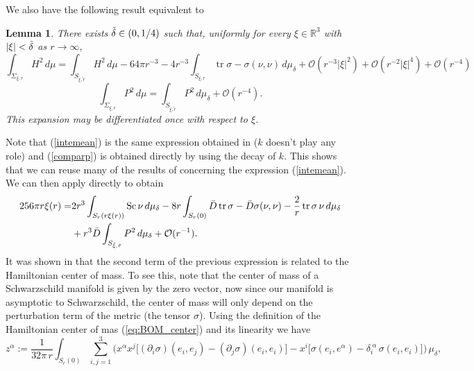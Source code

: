 \documentclass[12pt,a4paper]{amsart}
\theoremstyle{plain}
\newtheorem{lemma}[theorem]{Lemma}
\theoremstyle{definition}
\begin{document}
We also have the following result equivalent to \cite[Lemma 14]{willcen}
\begin{lemma}
    There exists \(\Tilde{\delta} \in (0, 1/4)\) such that, uniformly for every \(\xi \in \mathbb{R}^3\) with \(|\xi| < \Tilde{\delta}\) as \(r \to \infty\),
\begin{equation}\label{intemean}
\int_{\Sigma_{\xi,r}} H^2 \, d\mu = \int_{S_{\tilde{\xi},\tilde{r}}} H^2 \, d\mu - 64 \pi r^{-3} - 4 r^{-3} \int_{S_{\xi,r}} \operatorname{tr} \sigma - \sigma(\nu, \nu)\,  d\mu_{\delta} + \mathcal{O}(r^{-3} |\xi|^2) + \mathcal{O}(r^{-2} |\xi|^4) + \mathcal{O}(r^{-4})
\end{equation}
\begin{equation}\label{comparp}
    \int_{\Sigma_{\xi,r}} P^2 \, d\mu = \int_{S_{\tilde{\xi},\tilde{r}}} P^2 \, d\mu_{\delta} + \mathcal{O}(r^{-4}).
\end{equation}
This expansion may be differentiated once with respect to \(\xi\).
\end{lemma}
Note that (\ref{intemean}) is the same expression obtained in \cite[Lemma 14]{willcen} ($k$ doesn't play any role) and (\ref{comparp}) is obtained directly by using the decay of $k$. This shows that we can reuse many of the results of \cite{willcen} concerning the expression (\ref{intemean}).  We can then apply directly \cite[Proposition 18]{willcen} to obtain 
\begin{equation}\label{precenter}
    \begin{split}
       256 \pi r \xi(r) =& 2r^3 \int_{S_r(r \xi(r))} \mathrm{Sc} \, \nu\, d\mu_{\delta}-8 r \int_{S_r(0)}  \Bar{D} \operatorname{tr} \sigma -  \Bar{D}\sigma(\nu, \nu) -\frac{2}{r} \operatorname{tr} \sigma\, \nu \,d\mu_{\delta} \\
       &+ r^3\Bar{D} \int_{S_{\tilde{\xi},\tilde{r}}} P^2 \, d\mu_{\delta} + \mathcal{O}(r^{-1}). 
    \end{split}
\end{equation}
It was shown in \cite[Proposition 18]{willcen} that the second term of the previous expression is related to the Hamiltonian center of mass. To see this, note that the center of mass of a Schwarzschild manifold is given by the zero vector, now since our manifold is asymptotic to Schwarzschild, the center of mass will only depend on the perturbation term of the metric (the tensor $\sigma$).  Using the definition of the Hamiltonian center of mas  (\ref{eq:BOM_center}) and its linearity we have 
\[
z^\alpha := \frac{1}{32\pi\,r}
\int_{S_r(0)} 
\sum_{i,j=1}^3
\Big(
x^\alpha x^j \big[ (\partial_i \sigma)(e_i, e_j) - (\partial_j \sigma)(e_i, e_i) \big]
-
x^i \big[ \sigma(e_i, e^\alpha) - \delta_i^{\ \alpha}\,\sigma(e_i,e_i) \big]
\Big)
\, \mu_\delta,
\]
\end{document}
